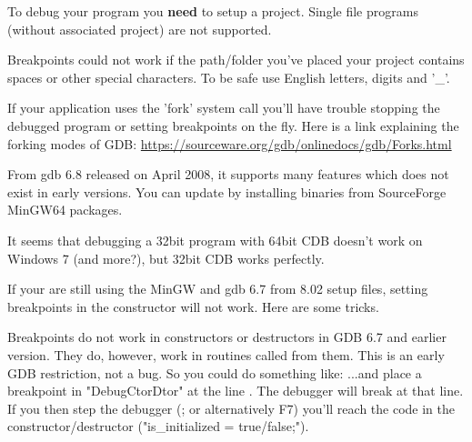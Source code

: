 
To debug your program you \textbf{need} to setup a project. Single file programs (without associated project) are not supported.


Breakpoints could not work if the path/folder you've placed your project contains spaces or other special characters. To be safe use English letters, digits and '\_'.


If your application uses the 'fork' system call you'll have trouble stopping the debugged program or setting breakpoints on the fly. Here is a link explaining the forking modes of GDB: \url{https://sourceware.org/gdb/onlinedocs/gdb/Forks.html}


From gdb 6.8 released on April 2008, it supports many features which does not exist in early versions. You can update by installing binaries from SourceForge MinGW64 packages.


It seems that debugging a 32bit program with 64bit CDB doesn't work on Windows 7 (and more?), but 32bit CDB works perfectly.



If your are still using the MinGW and gdb 6.7 from 8.02 setup files, setting breakpoints in the constructor will not work. Here are some tricks.

Breakpoints do not work in constructors or destructors in GDB 6.7 and earlier version. They do, however, work in routines called from them. This is an early GDB restriction, not a bug. So you could do something like: 
...and place a breakpoint in "DebugCtorDtor" at the line . The debugger will break at that line. If you then step the debugger (; or alternatively F7) you'll reach the code in the constructor/destructor ("is\_initialized = true/false;"). 
